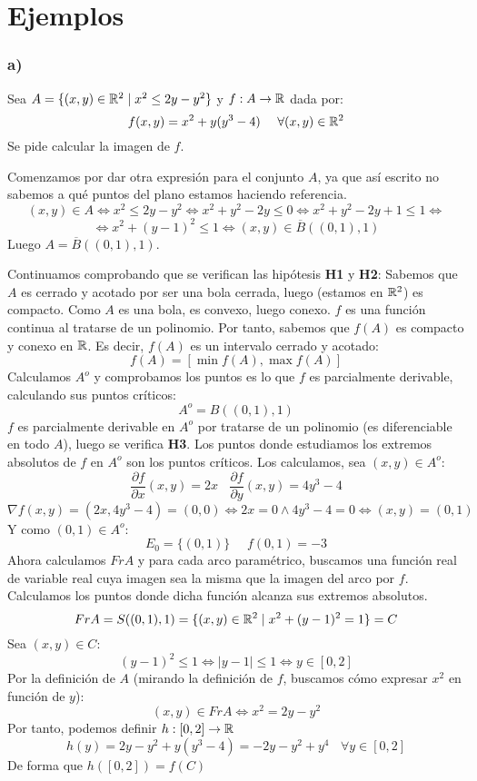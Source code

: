 \section{Ejemplos}
\subsubsection{a)}
Sea $A = \{(x,y) \in \mathbb R^2 \mid x^2 \leq 2y-y^2\}$ y $f:A \rightarrow \mathbb R$ dada por:
$$f(x,y) = x^2+y(y^3-4)~~~~\forall (x,y) \in \mathbb R^2$$
Se pide calcular la imagen de $f$.
\vspace{.5cm}

\noindent
Comenzamos por dar otra expresión para el conjunto $A$, ya que así escrito no sabemos a qué puntos del plano estamos haciendo referencia.
$$(x,y) \in A \Leftrightarrow x^2 \leq 2y-y^2 \Leftrightarrow x^2+y^2-2y \leq 0 \Leftrightarrow x^2+y^2-2y + 1\leq 1 \Leftrightarrow$$
$$\Leftrightarrow x^2 + (y-1)^2\leq 1 \Leftrightarrow (x,y) \in \overline{B}((0,1),1)$$
Luego $A = \overline{B}((0,1),1)$.
\vspace{.5cm}

\noindent
Continuamos comprobando que se verifican las hipótesis \textbf{H1} y \textbf{H2}:
Sabemos que $A$ es cerrado y acotado por ser una bola cerrada, luego (estamos en $\mathbb R^2$) es compacto.\newline
Como $A$ es una bola, es convexo, luego conexo.\newline
$f$ es una función continua al tratarse de un polinomio. Por tanto, sabemos que $f(A)$ es compacto y conexo en $\mathbb R$. Es decir, $f(A)$ es un intervalo cerrado y acotado:
$$f(A) = [\min f(A), \max f(A)]$$
Calculamos $A^o$ y comprobamos los puntos es lo que $f$ es parcialmente derivable, calculando sus puntos críticos:
$$A^o = B((0,1),1)$$
$f$ es parcialmente derivable en $A^o$ por tratarse de un polinomio (es diferenciable en todo $A$), luego se verifica \textbf{H3}. Los puntos donde estudiamos los extremos absolutos de $f$ en $A^o$ son los puntos críticos. Los calculamos, sea $(x,y) \in A^o$:
$$\dfrac{\partial f}{\partial x}(x,y) = 2x~~~~\dfrac{\partial f}{\partial y}(x,y) = 4y^3-4$$
$$\nabla f(x,y) = (2x, 4y^3-4) = (0,0) \Leftrightarrow 2x = 0 \land 4y^3-4 = 0 \Leftrightarrow (x,y) = (0,1)$$
Y como $(0,1) \in A^o$:
$$E_0 = \{(0,1)\}~~~~~~f(0,1) = -3$$
Ahora calculamos $FrA$ y para cada arco paramétrico, buscamos una función real de variable real cuya imagen sea la misma que la imagen del arco por $f$. Calculamos los puntos donde dicha función alcanza sus extremos absolutos.
$$FrA = S((0,1),1) = \{(x,y) \in \mathbb R^2 \mid x^2 + (y-1)^2 = 1\} = C$$
Sea $(x,y) \in C$:
$$(y-1)^2 \leq 1 \Leftrightarrow |y-1| \leq 1 \Leftrightarrow y \in [0,2]$$
Por la definición de $A$ (mirando la definición de $f$, buscamos cómo expresar $x^2$ en función de $y$):
$$(x,y) \in FrA \Leftrightarrow x^2 = 2y-y^2$$
Por tanto, podemos definir $h:[0,2] \rightarrow \mathbb R$
$$h(y) = 2y - y^2 + y(y^3-4) = -2y - y^2 + y^4~~~~\forall y \in [0,2]$$
De forma que $h([0,2]) = f(C)$
\vspace{.5cm}


